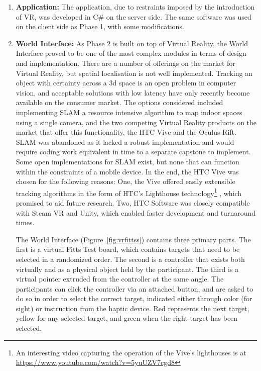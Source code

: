 \documentclass[
hidelinks,
12pt, %
oneside, %
english, %
doublespacing, %
headsepline, %
]{MastersDoctoralThesis} %
\begin{document}
\begin{enumerate}
	\item \textbf{Application: } The application, due to restraints imposed by the introduction of VR, was developed in C\# on the server side. The same software was used on the client side as Phase 1, with some modifications.


	\item \textbf{World Interface: } As Phase 2 is built on top of Virtual Reality, the World Interface proved to be one of the most complex modules in terms of design and implementation. There are a number of offerings on the market for Virtual Reality, but spatial localisation is not well implemented. Tracking an object with certainty across a 3d space is an open problem in computer vision, and acceptable solutions with low latency have only recently become available on the consumer market. The options considered included implementing SLAM \parencite{noauthor_simultaneous_2017} a resource intensive algorithm to map indoor spaces using a single camera, and the two competing Virtual Reality products on the market that offer this functionality, the HTC Vive and the Oculus Rift. SLAM was abandoned as it lacked a robust implementation and would require coding work equivalent in time to a separate capstone to implement. Some open implementations \parencite{yan_contribute_2017}
	\parencite{aivijay_lsd_slam_noros_2017} for SLAM exist, but none that can function within the constraints of a mobile device. In the end, the HTC Vive was chosen for the following reasons: One, the Vive offered easily extensible tracking algorithms in the form of HTC's Lighthouse technology\footnote{An interesting video capturing the operation of the Vive's lighthouses is at \href{https://www.youtube.com/watch?v=5yuUZV7cgd8}{https://www.youtube.com/watch?v=5yuUZV7cgd8}} \parencite{niehorster_accuracy_2017}, which promised to aid future research. Two, HTC Software was closely compatible with Steam VR and Unity, which enabled faster development and turnaround times.

	The World Interface (Figure~\ref{fig:vrfittss}) contains three primary parts. The first is a virtual Fitts Test board, which contains targets that need to be selected in a randomized order. The second is a controller that exists both virtually and as a physical object held by the participant. The third is a virtual pointer extruded from the controller at the same angle. The participants can click the controller via an attached button, and are asked to do so in order to select the correct target, indicated either through color (for sight) or instruction from the haptic device. Red represents the next target, yellow for any selected target, and green when the right target has been selected.


\end{enumerate}
\end{document}
